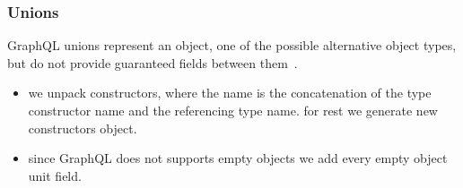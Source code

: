 \begin{frame}[allowframebreaks]\frametitle{Unions}

GraphQL unions represent an object, one of the possible alternative object types, but do not provide guaranteed fields between them~\cite{gql-spec}. 

\begin{itemize}
  \item we unpack constructors, where the name is the concatenation of the type constructor name and the referencing type name. for rest we generate new constructors object.
  \item since GraphQL does not supports empty objects we add every empty object unit field.
\end{itemize}


\end{frame}